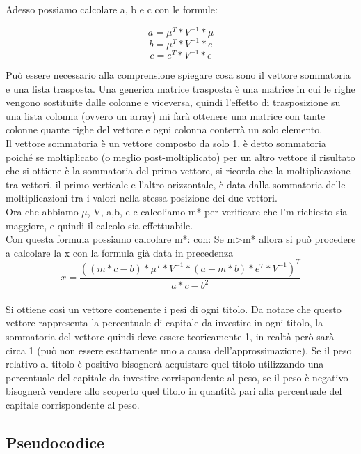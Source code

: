 \noindent
Adesso possiamo calcolare a, b e c con le formule:

\noindent
\[a = \mu^T * V^{-1} * \mu\] 
\[b = \mu^T * V^{-1} * e \]
\[c = e^T * V^{-1} * e \]

\noindent
Può essere necessario alla comprensione spiegare cosa sono il vettore sommatoria e una lista trasposta. Una generica matrice trasposta è una matrice in cui le righe vengono sostituite dalle colonne e viceversa, quindi l’effetto di trasposizione su una lista colonna (ovvero un array) mi farà ottenere una matrice con tante colonne quante righe del vettore e ogni colonna conterrà un solo elemento. \\
Il vettore sommatoria è un vettore composto da solo 1, è detto sommatoria poiché se moltiplicato (o meglio post-moltiplicato) per un altro vettore il risultato che si ottiene è la sommatoria del primo vettore, si ricorda che la moltiplicazione tra vettori, il primo verticale e l’altro orizzontale, è data dalla sommatoria delle moltiplicazioni tra i valori nella stessa posizione dei due vettori.\\

\noindent
Ora che abbiamo $\mu$, V, a,b, e c calcoliamo m* per verificare che l’m richiesto sia maggiore, e quindi il calcolo sia effettuabile.\\
Con questa formula possiamo calcolare m*:
con:
\noindent
Se m>m* allora si può procedere a calcolare la x con la formula già data in precedenza
\[ x = \frac{((m*c-b) * \mu^T * V^{-1} * (a-m*b)*e^T*V^{-1})^T}{ a*c-b^2 }\]
\\
\noindent
Si ottiene così un vettore contenente i pesi di ogni titolo. Da notare che questo vettore rappresenta la percentuale di capitale da investire in ogni titolo, la sommatoria del vettore quindi deve essere teoricamente 1, in realtà però sarà circa 1 (può non essere esattamente uno a causa dell’approssimazione). Se il peso relativo al titolo è positivo bisognerà acquistare quel titolo utilizzando una percentuale del capitale da investire corrispondente al peso, se il peso è negativo bisognerà vendere allo scoperto quel titolo in quantità pari alla percentuale del capitale corrispondente al peso.

\newpage
\subsection{Pseudocodice}


